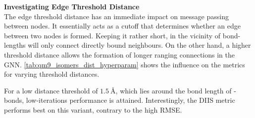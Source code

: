 \textbf{Investigating Edge Threshold Distance}\\
The edge threshold distance has an immediate impact on message passing between nodes. It essentially acts as a cutoff that determines whether an edge between two nodes is formed. Keeping it rather short, in the vicinity of bond-lengths will only connect directly bound neighbours. On the other hand, a higher threshold distance allows the formation of longer ranging connections in the GNN. \autoref{tab:qm9_isomers_dist_hyperparam} shows the influence on the metrics for varying threshold distances.  
\begin{table}[H]
    \centering
    \caption[GNN on QM9 isomers with different edge threshold distances]{GNN using different edge threshold distances (in $\unit{\angstrom}$) on QM9  isomers test set. Other hyperparameters are set according to \autoref{tab:init_hparams}.}
    \label{tab:qm9_isomers_dist_hyperparam}
\end{table}
For a low distance threshold of $\SI{1.5}{\angstrom}$, which lies around the bond length of - bonds, low-iterations performance is attained. Interestingly, the DIIS metric performs best on this variant, contrary to the high RMSE. 

